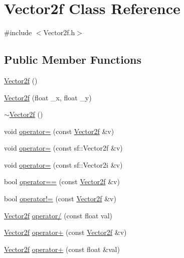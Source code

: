 \hypertarget{class_vector2f}{}\section{Vector2f Class Reference}
\label{class_vector2f}


{\ttfamily \#include $<$Vector2f.\+h$>$}

\subsection*{Public Member Functions}
\begin{DoxyCompactItemize}
\item 
\mbox{\hyperlink{class_vector2f_a3db9a868c58bc809e5e09a88d65a77ec}{Vector2f}} ()
\item 
\mbox{\hyperlink{class_vector2f_a4d82d9240b5de271e5e45c16e8de561e}{Vector2f}} (float \+\_\+x, float \+\_\+y)
\item 
\mbox{\hyperlink{class_vector2f_a2f820078721656f1952f46b0861e19ef}{$\sim$\+Vector2f}} ()
\item 
void \mbox{\hyperlink{class_vector2f_a4df9c7f05922119cb84b8ccd3cbce868}{operator=}} (const \mbox{\hyperlink{class_vector2f}{Vector2f}} \&v)
\item 
void \mbox{\hyperlink{class_vector2f_a39c1f54b2f9c0e3840dc5e4888c2cb6b}{operator=}} (const sf\+::\+Vector2f \&v)
\item 
void \mbox{\hyperlink{class_vector2f_a194dd3ffa8e7a7c4aea0333b965e2582}{operator=}} (const sf\+::\+Vector2i \&v)
\item 
bool \mbox{\hyperlink{class_vector2f_acab2685261fbe7d471f4bf201d32d1c2}{operator==}} (const \mbox{\hyperlink{class_vector2f}{Vector2f}} \&v)
\item 
bool \mbox{\hyperlink{class_vector2f_abd8a71379a15bee64aee32cf3824a5e6}{operator!=}} (const \mbox{\hyperlink{class_vector2f}{Vector2f}} \&v)
\item 
\mbox{\hyperlink{class_vector2f}{Vector2f}} \mbox{\hyperlink{class_vector2f_a38743f5e4f426a0b1a51a2bcafb9d4b6}{operator/}} (const float val)
\item 
\mbox{\hyperlink{class_vector2f}{Vector2f}} \mbox{\hyperlink{class_vector2f_a10ece16e53d788378932abb6f6212c68}{operator+}} (const \mbox{\hyperlink{class_vector2f}{Vector2f}} \&v)
\item 
\mbox{\hyperlink{class_vector2f}{Vector2f}} \mbox{\hyperlink{class_vector2f_ad9eef1fcb6d70b16b264a3aac5ae2081}{operator+}} (const float \&val)
\item 

\end{DoxyCompactItemize}
